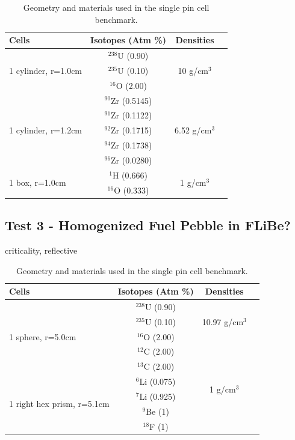 \documentclass[preprint,12pt]{elsarticle}
\begin{document}
\begin{table}[h]
\centering
\caption{Geometry and materials used in the single pin cell benchmark.}
\label{uo2_pincell_geom}
\begin{tabular}{| l | c | c | c |}
\hline
Cells & Isotopes (Atm \%)& Densities \\
\hline
\multirow{3}{*}{1 cylinder, r=1.0cm }  &   $^{238}$U   (0.90) &    \multirow{3}{*}{10 g/cm$^3$} \\
&  $^{235}$U (0.10)& \\
&  $^{16}$O  (2.00)& \\
\hline
\multirow{5}{*}{1 cylinder, r=1.2cm }  &   $^{90}$Zr   (0.5145) &    \multirow{5}{*}{6.52 g/cm$^3$} \\
&  $^{91}$Zr  (0.1122)& \\
&  $^{92}$Zr  (0.1715)& \\
&  $^{94}$Zr  (0.1738)& \\
&  $^{96}$Zr  (0.0280)& \\
\hline
\multirow{2}{*}{1 box, r=1.0cm }  &   $^{1}$H   (0.666) &    \multirow{2}{*}{1 g/cm$^3$} \\
&  $^{16}$O  (0.333)& \\
\hline
\end{tabular}
\end{table}

\subsection{Test 3 - Homogenized Fuel Pebble in FLiBe?}

criticality, reflective

\begin{table}[h]
\centering
\caption{Geometry and materials used in the single pin cell benchmark.}
\label{pebble_geom}
\begin{tabular}{| l | c | c | c |}
\hline
Cells & Isotopes (Atm \%)& Densities \\
\hline
\multirow{5}{*}{1 sphere, r=5.0cm }  &   $^{238}$U   (0.90) &    \multirow{3}{*}{10.97 g/cm$^3$} \\
&  $^{235}$U (0.10)& \\
&  $^{16}$O  (2.00)& \\
&  $^{12}$C  (2.00)& \\
&  $^{13}$C  (2.00)& \\
\hline
\multirow{4}{*}{1 right hex prism, r=5.1cm }  &   $^{6}$Li  (0.075) &    \multirow{2}{*}{1 g/cm$^3$} \\
&  $^{7}$Li  (0.925)& \\
& $^{9}$Be   (1) & \\
&  $^{18}$F   (1) & \\
\hline
\end{tabular}
\end{table}
\end{document}
